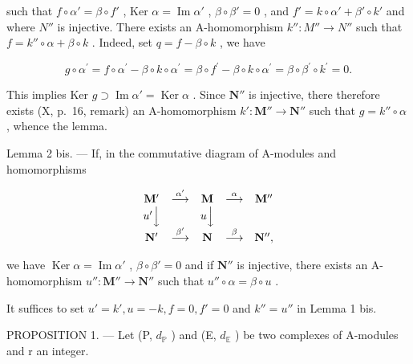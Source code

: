 such that \(f \circ \alpha' = \beta \circ f'\) , Ker \(\alpha = \operatorname{Im} \alpha'\) , \(\beta \circ \beta' = 0\) , and \(f' = k \circ \alpha' + \beta' \circ k'\) and where \(N''\) is injective. There exists an A-homomorphism \(k'' : M'' \to N''\) such that \(f = k'' \circ \alpha + \beta \circ k\) . Indeed, set \(q = f - \beta \circ k\) , we have

\[
g \circ \alpha^ {\prime} = f \circ \alpha^ {\prime} - \beta \circ k \circ \alpha^ {\prime} = \beta \circ f ^ {\prime} - \beta \circ k \circ \alpha^ {\prime} = \beta \circ \beta^ {\prime} \circ k ^ {\prime} = 0.
\]

This implies Ker \(g \supset \operatorname{Im} \alpha' = \operatorname{Ker} \alpha\) . Since \(\mathbf{N}''\) is injective, there therefore exists (X, p.~16, remark) an A-homomorphism \(k': \mathbf{M}'' \to \mathbf{N}''\) such that \(g = k'' \circ \alpha\) , whence the lemma.

Lemma 2 bis. --- If, in the commutative diagram of A-modules and homomorphisms

\[
\begin{array}{c c c c c} \mathbf {M} ^ {\prime} & \stackrel {{\alpha^ {\prime}}} {{\longrightarrow}} & \mathbf {M} & \stackrel {{\alpha}} {{\longrightarrow}} & \mathbf {M} ^ {\prime \prime} \\ u ^ {\prime} \Big \downarrow & & u \Big \downarrow & & \\ \mathbf {N} ^ {\prime} & \stackrel {{\beta^ {\prime}}} {{\longrightarrow}} & \mathbf {N} & \stackrel {{\beta}} {{\longrightarrow}} & \mathbf {N} ^ {\prime \prime}, \end{array}
\]

we have \(\operatorname{Ker} \alpha = \operatorname{Im} \alpha'\) , \(\beta \circ \beta' = 0\) and if \(\mathbf{N}''\) is injective, there exists an A-homomorphism \(u'' : \mathbf{M}'' \to \mathbf{N}''\) such that \(u'' \circ \alpha = \beta \circ u\) .

It suffices to set \(u' = k', u = -k, f = 0, f' = 0\) and \(k'' = u''\) in Lemma 1 bis.

PROPOSITION 1. --- Let (P, \(d_{\mathbb{P}}\) ) and (E, \(d_{\mathbb{E}}\) ) be two complexes of A-modules and r an integer.

